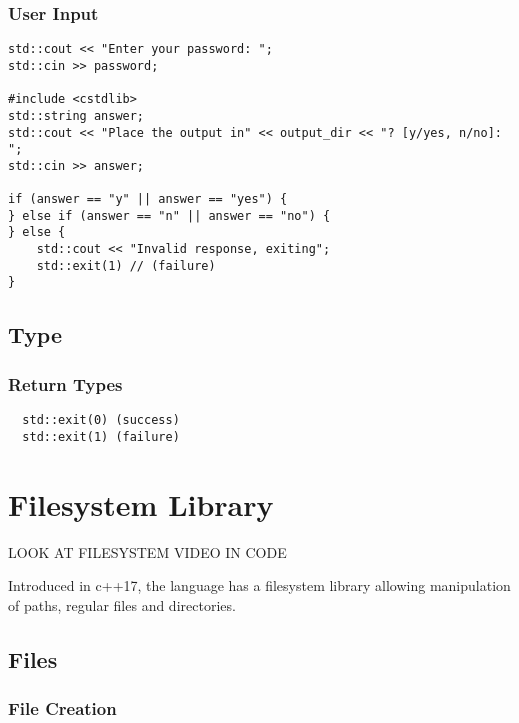 \subsection{User Input}

\begin{verbatim}
std::cout << "Enter your password: ";
std::cin >> password;

#include <cstdlib>
std::string answer;
std::cout << "Place the output in" << output_dir << "? [y/yes, n/no]: ";
std::cin >> answer;

if (answer == "y" || answer == "yes") {
} else if (answer == "n" || answer == "no") {
} else {
    std::cout << "Invalid response, exiting";
    std::exit(1) // (failure)
}
\end{verbatim}

\section{Type}

\subsection{Return Types}

\begin{verbatim}
  std::exit(0) (success)
  std::exit(1) (failure)
\end{verbatim}

\chapter{Filesystem Library}

LOOK AT FILESYSTEM VIDEO IN CODE

Introduced in c++17, the language has a filesystem library allowing
manipulation of paths, regular files and directories.

\section{Files}

\subsection{File Creation}

